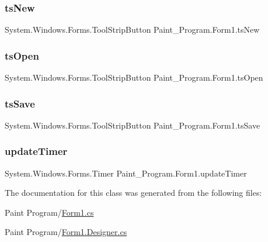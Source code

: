 \subsubsection{\texorpdfstring{ts\+New}{tsNew}}
{\footnotesize\ttfamily System.\+Windows.\+Forms.\+Tool\+Strip\+Button Paint\+\_\+\+Program.\+Form1.\+ts\+New\hspace{0.3cm}{\ttfamily [private]}}

\mbox{\label{class_paint___program_1_1_form1_a605dc1d6022ba8f753b7f4f3f5d3b4cd}} 
\subsubsection{\texorpdfstring{ts\+Open}{tsOpen}}
{\footnotesize\ttfamily System.\+Windows.\+Forms.\+Tool\+Strip\+Button Paint\+\_\+\+Program.\+Form1.\+ts\+Open\hspace{0.3cm}{\ttfamily [private]}}

\mbox{\label{class_paint___program_1_1_form1_a4624b2b2d1e12703beaf5eb4c0d9ed43}} 
\subsubsection{\texorpdfstring{ts\+Save}{tsSave}}
{\footnotesize\ttfamily System.\+Windows.\+Forms.\+Tool\+Strip\+Button Paint\+\_\+\+Program.\+Form1.\+ts\+Save\hspace{0.3cm}{\ttfamily [private]}}

\mbox{\label{class_paint___program_1_1_form1_acecdd498b40a257daf3424d49e172a9d}} 
\subsubsection{\texorpdfstring{update\+Timer}{updateTimer}}
{\footnotesize\ttfamily System.\+Windows.\+Forms.\+Timer Paint\+\_\+\+Program.\+Form1.\+update\+Timer\hspace{0.3cm}{\ttfamily [private]}}



The documentation for this class was generated from the following files\+:\begin{DoxyCompactItemize}
\item 
Paint Program/\mbox{\hyperlink{_form1_8cs}{Form1.\+cs}}\item 
Paint Program/\mbox{\hyperlink{_form1_8_designer_8cs}{Form1.\+Designer.\+cs}}\end{DoxyCompactItemize}
